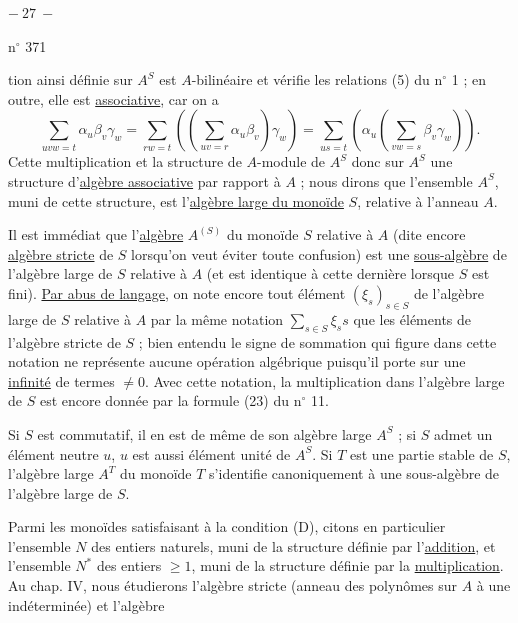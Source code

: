 \begin{center}$-\ 27\ -$\end{center}
\hfill n$^\circ$ 371

tion ainsi définie sur $A^S$ est $A$-bilinéaire et vérifie les relations (5) du n$^\circ$ 1 ; en outre, elle est \uline{associative}, car on a
\[
\sum_{uvw=t}\alpha_u\beta_v\gamma_w=\sum_{rw=t}\left(\left(\sum_{uv=r}\alpha_u\beta_v\right)\gamma_w\right)=\sum_{us=t}\left(\alpha_u\left(\sum_{vw=s}\beta_v\gamma_w\right)\right).
\]
Cette multiplication et la structure de $A$-module de $A^S$  donc sur $A^S$ une structure d'\uline{algèbre associative} par rapport à $A$ ; nous dirons que l'ensemble $A^S$, muni de cette structure, est l'\uline{algèbre large du monoïde} $S$, relative à l'anneau $A$.

Il est immédiat que l'\uline{algèbre} $A^{(S)}$ du monoïde $S$ relative à $A$ (dite encore \uline{algèbre stricte} de $S$ lorsqu'on veut éviter toute confusion) est une \uline{sous-algèbre} de l'algèbre large de $S$ relative à $A$ (et est identique à cette dernière lorsque $S$ est fini). \uline{Par abus de langage}, on note encore tout élément $(\xi_s)_{s\in S}$ de l'algèbre large de $S$ relative à $A$ par la même notation $\sum_{s\in S}\xi_s s$ que les éléments de l'algèbre stricte de $S$ ; bien entendu le signe de sommation qui figure dans cette notation ne représente aucune opération algébrique puisqu'il porte sur une \uline{infinité} de termes $\ne0$. Avec cette notation, la multiplication dans l'algèbre large de $S$ est encore donnée par la formule (23) du n$^\circ$ 11.

Si $S$ est commutatif, il en est de même de son algèbre large $A^S$ ; si $S$ admet un élément neutre $u$, $u$ est aussi élément unité de $A^S$. Si $T$ est une partie stable de $S$, l'algèbre large $A^T$ du monoïde $T$ s'identifie canoniquement à une sous-algèbre de l'algèbre large de $S$.

Parmi les monoïdes satisfaisant à la condition (D), citons en particulier l'ensemble $N$ des entiers naturels, muni de la structure définie par l'\uline{addition}, et l'ensemble $N^*$ des entiers $\ge1$, muni de la structure définie par la \uline{multiplication}. Au chap. IV, nous étudierons l'algèbre stricte (anneau des polynômes sur $A$ à une indéterminée) et l'algèbre
